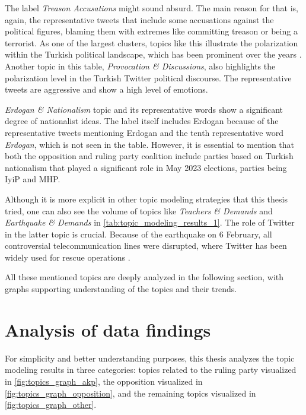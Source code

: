 The label \textit{Treason Accusations} might sound absurd. The main reason for that is, again, 
the representative tweets that include some accusations against the political figures, 
blaming them with extremes like committing treason or being a terrorist. As one of the largest 
clusters, topics like this illustrate the polarization within the Turkish political landscape, 
which has been prominent over the years \parencite{cevik_turkey_polarization_2018}. 
Another topic in this table, \textit{Provocation \& Discussions}, also highlights the 
polarization level in the Turkish Twitter political discourse. The representative tweets are 
aggressive and show a high level of emotions.

\textit{Erdogan \& Nationalism} topic and its representative words show a significant degree 
of nationalist ideas. The label itself includes Erdogan because of the representative tweets 
mentioning Erdogan and the tenth representative word \textit{Erdogan}, which is not seen in the table. 
However, it is essential to mention that both the opposition and ruling party coalition 
include parties based on Turkish nationalism that played a significant role in May 2023 
elections, parties being \ac{IyiP} and \ac{MHP}.

Although it is more explicit in other topic modeling strategies that this thesis tried, 
one can also see the volume of topics like \textit{Teachers \& Demands} and \textit{Earthquake \& Demands} 
in \autoref{tab:topic_modeling_results_1}. The role of Twitter in the latter topic is crucial. 
Because of the earthquake on 6 February, all controversial telecommunication lines were disrupted, 
where Twitter has been widely used for rescue operations \parencite{cevik_aksoy_turkey_earthquake_2023}.

All these mentioned topics are deeply analyzed in the following section, with 
graphs supporting understanding of the topics and their trends.

\section{Analysis of data findings}

For simplicity and better understanding purposes, this thesis analyzes the topic modeling results 
in three categories: topics related to the ruling party visualized in \autoref{fig:topics_graph_akp}, 
the opposition visualized in \autoref{fig:topics_graph_opposition}, and the remaining topics 
visualized in \autoref{fig:topics_graph_other}. 

